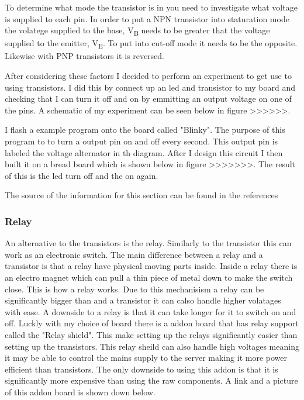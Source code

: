 \documentclass{article}
\begin{document}
To determine what mode the transistor is in you need to investigate what voltage is supplied to each pin.
In order to put a NPN transistor into staturation mode the volatege supplied to the base, V\textsubscript{B}
needs to be greater that the voltage supplied to the emitter, V\textsubscript{E}. To put into cut-off mode
it needs to be the opposite. Likewise with PNP transistors it is reversed.

After considering these factors I decided to perform an experiment to get use to using transistors. I did
this by connect up an led and transistor to my board and checking that I can turn it off and on by emmitting
an output voltage on one of the pins. A schematic of my experiment can be seen below in figure >>>>>>.



I flash a example program onto the board called "Blinky". The purpose of this program to to turn a output
pin on and off every second. This output pin is labeled the voltage alternator in th diagram. After I
design this circuit I then built it on a bread board which is shown below in figure >>>>>>>. The result
of this is the led turn off and the on again.

The source of the information for this section can be found in the references \cite{transistor}

\subsubsection{Relay}

An alternative to the transistors is the relay. Similarly to the transistor this can work as an electronic
switch. The main difference between a relay and a transistor is that a relay have physical moving parts
inside. Inside a relay there is an electro magnet which can pull a thin piece of metal down to make the 
switch close. This is how a relay works. Due to this mechanisism a relay can be significantly bigger than
and a transistor it can calso handle higher volatages with ease. A downside to a relay is that it can
take longer for it to switch on and off. Luckly with my choice of board there is a addon board that has
relay support called the "Relay shield". This make setting up the relays significantly easier than setting
up the transistors. This relay sheild can also handle high voltages meaning it may be able to control the
mains supply to the server making it more power efficient than transistors. The only downside to using this
addon is that it is significantly more expensive than using the raw components. A link and a picture of this
addon board is shown down below.
\end{document}

